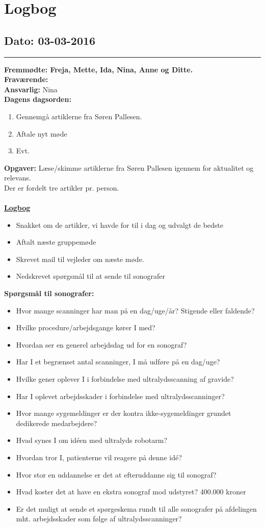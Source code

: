 \chapter{Logbog}
\section{Dato: 03-03-2016}
\hrule
\textbf{Fremmødte: Freja, Mette, Ida, Nina, Anne og Ditte.} \\
\textbf{Fraværende: } \\
\textbf{Ansvarlig: }Nina  \\
\textbf{Dagens dagsorden: }
\begin{enumerate}
	\item Gennemgå artiklerne fra Søren Pallesen.
	\item Aftale nyt møde
	\item Evt. 
\end{enumerate}

\textbf{Opgaver:} \newline
Læse/skimme artiklerne fra Søren Pallesen igennem for aktualitet og relevans. \\
Der er fordelt tre artikler pr. person.\\\\
\underline{\textbf{Logbog}}
\begin{itemize}
\item Snakket om de artikler, vi havde for til i dag og udvalgt de bedste
\item Aftalt næste gruppemøde
\item Skrevet mail til vejleder om næste møde.
\item Nedskrevet spørgsmål til at sende til sonografer
\end{itemize}
\textbf{Spørgsmål til sonografer:}
\begin{itemize}
\item Hvor mange scanninger har man på en dag/uge/år? Stigende eller faldende?
\item Hvilke procedure/arbejdsgange kører I med?
\item Hvordan ser en generel arbejdsdag ud for en sonograf?
\item Har I et begrænset antal scanninger, I må udføre på en dag/uge?
\item Hvilke gener oplever I i forbindelse med ultralydsscanning af gravide?
\item Har I oplevet arbejdsskader i forbindelse med ultralydsscanninger?
\item Hvor mange sygemeldinger er der kontra ikke-sygemeldinger grundet dedikerede medarbejdere?
\item Hvad synes I om idéen med ultralyds robotarm?
\item Hvordan tror I, patienterne vil reagere på denne idé?
\item Hvor stor en uddannelse er det at efteruddanne sig til sonograf?
\item Hvad koster det at have en ekstra sonograf mod udstyret?
400.000 kroner
\item Er det muligt at sende et spørgeskema rundt til alle sonografer på afdelingen mht. arbejdsskader som følge af ultralydsscanninger?
\end{itemize}
